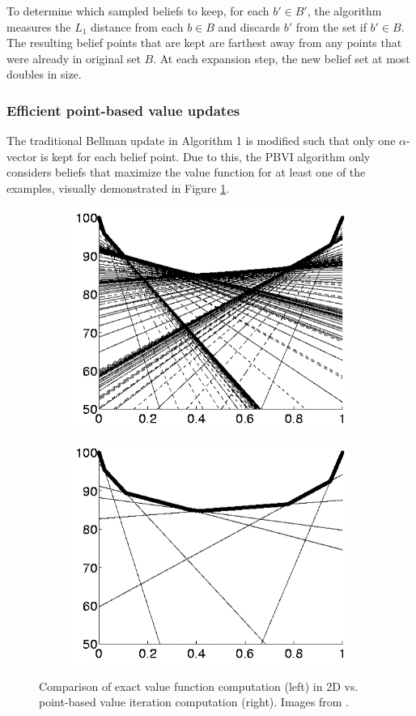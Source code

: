 \documentclass[12pt]{elsarticle}
\begin{document}
To determine which sampled beliefs to keep, for each $b' \in B'$, the algorithm measures the $L_1$ distance from each $b \in B$ and discards $b'$ from the set if $b' \in B$. The resulting belief points that are kept are farthest away from any points that were already in original set $B$. At each expansion step, the new belief set at most doubles in size.

\subsubsection{Efficient point-based value updates}
The traditional Bellman update in Algorithm 1 is modified such that only one $\alpha$-vector is kept for each belief point. Due to this, the PBVI algorithm only considers beliefs that maximize the value function for at least one of the examples, visually demonstrated in Figure \ref{fig:pbvi_vs_value}.

\begin{figure}[h!]
\centering 
\begin{subfigure}
    \centering 
    \includegraphics[width=0.4\columnwidth]{value_function.png}
    \centering
\end{subfigure}%
\begin{subfigure}
    \centering
    \includegraphics[width=0.4\columnwidth]{pbvi_value_function.png}
    \centering
\end{subfigure}%
\caption{Comparison of exact value function computation (left) in 2D vs. point-based value iteration computation (right). Images from \cite{weld_2012}.}
\label{fig:pbvi_vs_value}
\end{figure}
\end{document}
